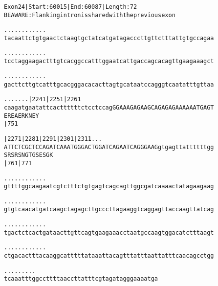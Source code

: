 \documentclass{article}
\begin{document}
\newpage
\begin{alltt}
Exon 24 | Start: 60015 | End: 60087 | Length: 72
BE AWARE: Flanking intron is shared with the previous exon

.    .    .    .    .    .    .    .    .    .    .    .
tacaattctgtgaactctaagtgctatcatgatagacccttgttctttattgtgccagaa



.    .    .    .    .    .    .    .    .    .    .    .
tcctaggaagactttgtcacggccatttggaatcattgaccagcacagttgaagaaagct



.    .    .    .    .    .    .    .    .    .    .    .
gacttcttgtcatttgcacgggacacacttagtgcataatccagggtcaatatttgttaa



.    .    .    .    .    .    .|2241     |2251     |2261
caagatgaatattcacttttttctcctccagGGAAAGAGAAGCAGAGAGAAAAAATGAGT
                                E  R  E  A  E  R  K  N  E  Y
                                         |751

 |2271     |2281     |2291     |2301     |2311  .    .    .
ATTCTCGCTCCAGATCAAATGGGACTGGATCAGAATCAGGGAAGgtgagttattttttgg
  S  R  S  R  S  N  G  T  G  S  E  S  G  K
           |761                          |771

   .    .    .    .    .    .    .    .    .    .    .    .
gttttggcaagaatcgtctttctgtgagtcagcagttggcgatcaaaactatagaagaag



   .    .    .    .    .    .    .    .    .    .    .    .
gtgtcaacatgatcaagctagagcttgcccttagaaggtcaggagttaccaagttatcag



   .    .    .    .    .    .    .    .    .    .    .    .
tgactctcactgataacttgttcagtgaagaaacctaatgccaagtggacatctttaagt



\end{alltt}
\newpage
\begin{alltt}
   .    .    .    .    .    .    .    .    .    .    .    .
ctgacactttacaaggcatttttataaattacagtttatttaattatttcaacagcctgg



   .    .    .    .    .    .    .    .    .
tcaaatttggccttttaaccttatttcgtagatagggaaaatga


\end{alltt}
\newpage
\end{document}
